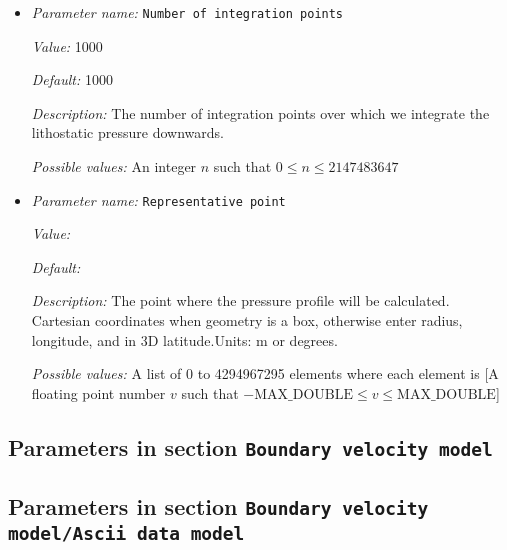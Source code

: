 \begin{itemize}
\item {\it Parameter name:} {\tt Number of integration points}
\label{parameters:Boundary traction model/Initial lithostatic pressure/Number of integration points}


{\it Value:} 1000


{\it Default:} 1000


{\it Description:} The number of integration points over which we integrate the lithostatic pressure downwards. 


{\it Possible values:} An integer $n$ such that $0\leq n \leq 2147483647$
\item {\it Parameter name:} {\tt Representative point}
\label{parameters:Boundary traction model/Initial lithostatic pressure/Representative point}


{\it Value:} 


{\it Default:} 


{\it Description:} The point where the pressure profile will be calculated. Cartesian coordinates when geometry is a box, otherwise enter radius, longitude, and in 3D latitude.Units: m or degrees.


{\it Possible values:} A list of 0 to 4294967295 elements where each element is [A floating point number $v$ such that $-\text{MAX\_DOUBLE} \leq v \leq \text{MAX\_DOUBLE}$]
\end{itemize}

\subsection{Parameters in section \tt Boundary velocity model}
\label{parameters:Boundary_20velocity_20model}


\subsection{Parameters in section \tt Boundary velocity model/Ascii data model}
\label{parameters:Boundary_20velocity_20model/Ascii_20data_20model}

